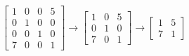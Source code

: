 \documentclass{minimal}
\begin{document}
    $ \left[
    \begin{smallmatrix}
        1 & 0 & 0 & 5 \\
        0 & 1 & 0 & 0 \\
        0 & 0 & 1 & 0 \\
        7 & 0 & 0 & 1
    \end{smallmatrix}
    \right]
    \rightarrow
    \left[
    \begin{smallmatrix}
        1 & 0 & 5 \\
        0 & 1 & 0 \\
        7 & 0 & 1
    \end{smallmatrix}
    \right]
    \rightarrow
    \left[
    \begin{smallmatrix}
        1 & 5 \\
        7 & 1
    \end{smallmatrix}
    \right] $
\end{document}
